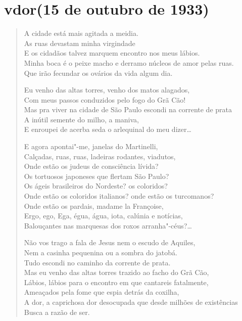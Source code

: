 {%
\pagebreak
\section*{v\break dor\break (15 de outubro de 1933)}

\begin{verse}
A cidade está mais agitada a meidia.\\
As ruas devastam minha virgindade\\
E os cidadãos talvez marquem encontro nos meus lábios.\\
Minha boca é o peixe macho e derramo núcleos de amor pelas ruas.\\
Que irão fecundar os ovários da vida algum dia.

Eu venho das altas torres, venho dos matos alagados,\\
Com meus passos conduzidos pelo fogo do Grã Cão!\\
Mas pra viver na cidade de São Paulo escondi na corrente de prata\\
A inútil semente do milho, a maniva,\\
E enroupei de acerba seda o arlequinal do meu dizer\ldots{}

E agora apontai"-me, janelas do Martinelli,\\
Calçadas, ruas, ruas, ladeiras rodantes, viadutos,\\
Onde estão os judeus de consciência lívida?\\
Os tortuosos japoneses que flertam São Paulo?\\
Os ágeis brasileiros do Nordeste? os coloridos?\\
Onde estão os coloridos italianos? onde estão os turcomanos?\\
Onde estão os pardais, madame la Françoise,\\
Ergo, ego, Ega, égua, água, iota, calúnia e notícias,\\
Balouçantes nas marquesas dos roxos arranha"-céus?\ldots{}

Não vos trago a fala de Jesus nem o escudo de Aquiles,\\
Nem a casinha pequenina ou a sombra do jatobá.\\
Tudo escondi no caminho da corrente de prata.\\
Mas eu venho das altas torres trazido ao facho do Grã Cão,\\
Lábios, lábios para o encontro em que cantareis fatalmente,\\
Ameaçados pela fome que espia detrás da coxilha,\\
A dor, a caprichosa dor desocupada que desde milhões de existências\\
Busca a razão de ser.
\end{verse}

}
